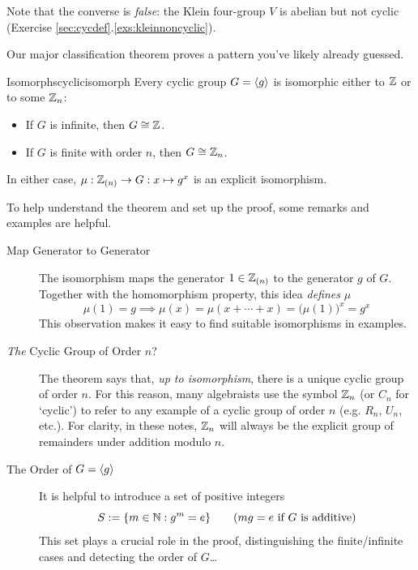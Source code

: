 Note that the converse is \emph{false}: the Klein four-group $V$ is abelian but not cyclic (Exercise \ref*{sec:cycdef}.\ref{exs:kleinnoncyclic}).\medbreak

Our major classification theorem proves a pattern you've likely already guessed.

\begin{thm}{Isomorphs}{cyclicisomorph}
	Every cyclic group $G=\left\langle g\right\rangle$ is isomorphic either to $\mathbb{Z}$ or to some $\mathbb{Z}_n$:
	\begin{itemize}
	  \item If $G$ is infinite, then $G\cong\mathbb{Z}$.
	  \item If $G$ is finite with order $n$, then $G\cong\mathbb{Z}_n$.
	\end{itemize}
	In either case, $\mu:\mathbb{Z}_{(n)}\to G:x\mapsto g^x$ is an explicit isomorphism.
\end{thm}

To help understand the theorem and set up the proof, some remarks and examples are helpful.
\begin{description}
  \item[Map Generator to Generator] The isomorphism maps the generator $1\in\mathbb{Z}_{(n)}$ to the generator $g$ of $G$. Together with the homomorphism property, this idea \emph{defines} $\mu$
  \[
  	\mu(1)=g\implies \mu(x)=\mu(x+\cdots +x)=\bigl(\mu(1)\bigr)^x=g^x
  \]
  This observation makes it easy to find suitable isomorphisms in examples.
  \item[\emph{The} Cyclic Group of Order $n$?] The theorem says that, \emph{up to isomorphism}, there is a unique cyclic group of order $n$. For this reason, many algebraists use the symbol $\mathbb{Z}_n$ (or $C_n$ for `cyclic') to refer to any example of a cyclic group of order $n$ (e.g. $R_n$, $U_n$, etc.). For clarity, in these notes, $\mathbb{Z}_n$ will always be the explicit group of remainders under addition modulo $n$.
  \item[The Order of $G=\left\langle g\right\rangle$] It is helpful to introduce a set of positive integers
  \[
  	S:=\{m\in\mathbb{N}:g^m=e\} \tag{$mg=e$ if $G$ is additive}
  \]
  This set plays a crucial role in the proof, distinguishing the finite/infinite cases and detecting the order of $G$\ldots
\end{description}


